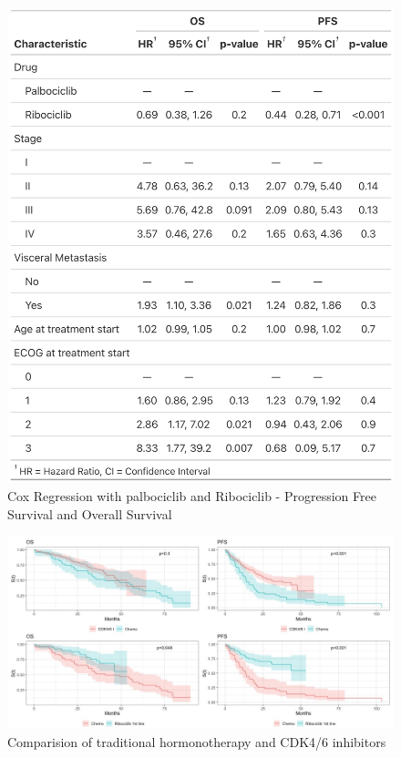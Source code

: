 \begin{figure}[ht]
  \centering
  \caption{Cox Regression with palbociclib and Ribociclib - Progression Free Survival and Overall Survival}\label{fig:cox} 
  \includegraphics[scale=0.3]{figures/cox_both.png}%

\end{figure}

\begin{figure}[ht]
  \centering

  \caption{Comparision of traditional hormonotherapy and CDK4/6 inhibitors  }\label{fig:grouped} 
  \includegraphics[scale=0.4]{figures/grouped_curve_both.jpeg}%

\end{figure}

